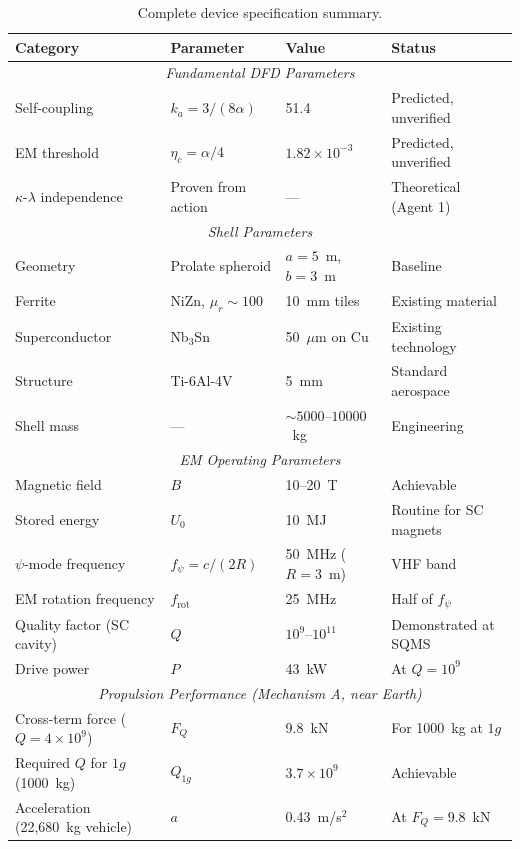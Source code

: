 \documentclass[12pt,aps,prd,superscriptaddress,nofootinbib,longbibliography]{revtex4-2}
\newcommand{\ka}{k_a}
\newcommand{\etac}{\eta_c}
\begin{document}
\begin{table}[t]
\caption{Complete device specification summary.}
\begin{ruledtabular}
\begin{tabular}{llll}
Category & Parameter & Value & Status \\
\hline
\multicolumn{4}{c}{\textit{Fundamental DFD Parameters}} \\
Self-coupling & $\ka = 3/(8\alpha)$ & 51.4 & Predicted, unverified \\
EM threshold & $\etac = \alpha/4$ & $1.82 \times 10^{-3}$ & Predicted, unverified \\
$\kappa$-$\lambda$ independence & Proven from action & --- & Theoretical (Agent 1) \\
\hline
\multicolumn{4}{c}{\textit{Shell Parameters}} \\
Geometry & Prolate spheroid & $a = 5$~m, $b = 3$~m & Baseline \\
Ferrite & NiZn, $\mu_r \sim 100$ & 10~mm tiles & Existing material \\
Superconductor & Nb$_3$Sn & 50~$\mu$m on Cu & Existing technology \\
Structure & Ti-6Al-4V & 5~mm & Standard aerospace \\
Shell mass & --- & $\sim 5000$--$10000$~kg & Engineering \\
\hline
\multicolumn{4}{c}{\textit{EM Operating Parameters}} \\
Magnetic field & $B$ & 10--20~T & Achievable \\
Stored energy & $U_0$ & 10~MJ & Routine for SC magnets \\
$\psi$-mode frequency & $f_\psi = c/(2R)$ & 50~MHz ($R = 3$~m) & VHF band \\
EM rotation frequency & $f_{\mathrm{rot}}$ & 25~MHz & Half of $f_\psi$ \\
Quality factor (SC cavity) & $Q$ & $10^9$--$10^{11}$ & Demonstrated at SQMS \\
Drive power & $P$ & 43~kW & At $Q = 10^9$ \\
\hline
\multicolumn{4}{c}{\textit{Propulsion Performance (Mechanism A, near Earth)}} \\
Cross-term force ($Q = 4 \times 10^9$) & $F_Q$ & 9.8~kN & For 1000~kg at $1g$ \\
Required $Q$ for $1g$ (1000~kg) & $Q_{1g}$ & $3.7 \times 10^9$ & Achievable \\
Acceleration (22,680~kg vehicle) & $a$ & 0.43~m/s$^2$ & At $F_Q = 9.8$~kN \\

\end{tabular}
\end{ruledtabular}
\end{table}
\end{document}
